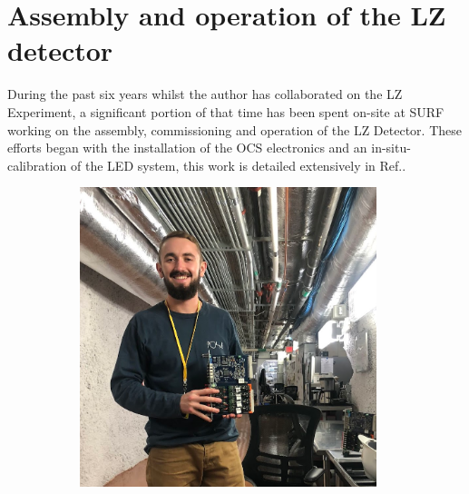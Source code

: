 \section{Assembly and operation of the LZ detector}
During the past six years whilst the author has collaborated on the LZ Experiment, a significant portion of that time has been spent on-site at SURF working on the assembly, commissioning and operation of the LZ Detector. These efforts began with the installation of the OCS electronics and an in-situ-calibration of the LED system, this work is detailed extensively in Ref.\cite{hbirch:thesis}.
\begin{figure}
     \centering
     \begin{subfigure}{0.47\textwidth}
         \centering
         \includegraphics[width=0.95\textwidth]{figures/LZ/OCSMotherboardCC.png}
         \label{fig:Gonk0}
     \end{subfigure}
     \begin{subfigure}{0.47\textwidth}
         \centering

\end{subfigure}
\end{figure}

